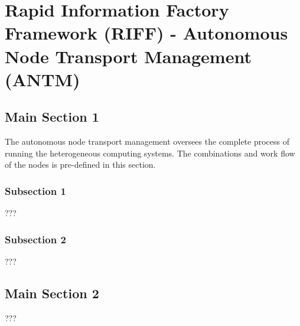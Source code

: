 
\chapter{Rapid Information Factory Framework (RIFF) - Autonomous Node Transport Management (ANTM)} %

\label{Chapter19} %



\section{Main Section 1}

The autonomous node transport management oversees the complete process of running the heterogeneous computing systems. The combinations and work flow of the nodes is pre-defined in this section.

\subsection{Subsection 1}

???


\subsection{Subsection 2}

???


\section{Main Section 2}

???
